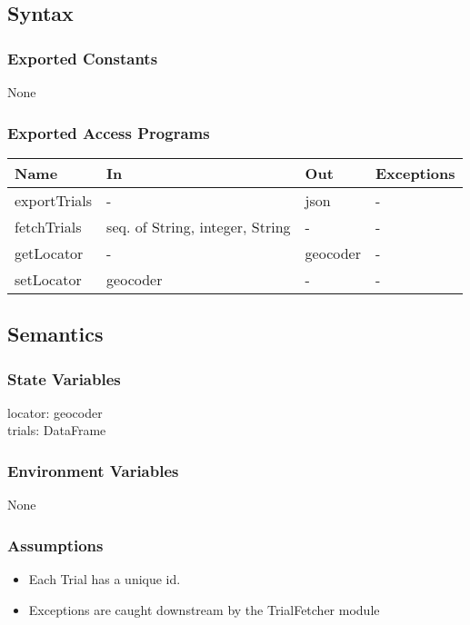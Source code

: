 \documentclass[12pt, titlepage]{article}
\begin{document}
\subsection{Syntax}

\subsubsection{Exported Constants}
None

\subsubsection{Exported Access Programs}

\begin{center}
\begin{tabular}{p{4cm} p{4cm} p{4cm} p{4cm}}
\hline
\textbf{Name} & \textbf{In} & \textbf{Out} & \textbf{Exceptions} \\
\hline
exportTrials & - & json & - \\
\hline
fetchTrials & seq. of String, integer, String & - & - \\
\hline
getLocator & - & geocoder & - \\
\hline
setLocator & geocoder & - & - \\
\hline
\end{tabular}
\end{center}

\subsection{Semantics}

\subsubsection{State Variables}
locator: geocoder \\
trials: DataFrame

\subsubsection{Environment Variables}
None

\subsubsection{Assumptions}
\begin{itemize}
  \item Each Trial has a unique id.
  \item Exceptions are caught downstream by the TrialFetcher module
\end{itemize}
\end{document}
